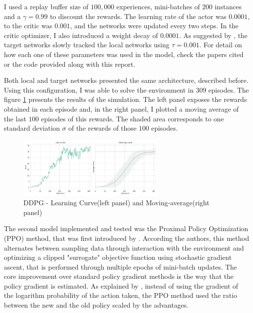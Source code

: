 \documentclass[a4paper]{article}
\begin{document}
I used a replay buffer size of $100,000$ experiences, mini-batches of $200$ instances and a $\gamma=0.99$ to discount the rewards. The learning rate of the actor was $0.0001$, to the critic was $0.001$, and the networks were updated every two steps. In the critic optimizer, I also introduced a weight decay of $0.0001$. As suggested by \cite{Lillicrap:2015ww}, the target networks slowly tracked the local networks using $\tau=0.001$. For detail on how each one of these parameters was used in the model, check the papers cited or the code provided along with this report.

Both local and target networks presented the same architecture, described before. Using this configuration, I was able to solve the environment in $309$ episodes. The figure \ref{fig:ddpg} presents the results of the simulation. The left panel exposes the rewards obtained in each episode and, in the right panel, I plotted a moving average of the last $100$ episodes of this rewards. The shaded area corresponds to one standard deviation $\sigma$ of the rewards of those $100$ episodes.

\begin{figure}[ht]
\centering
\includegraphics[width=0.65\textwidth]{../notebooks/figures/2018-10-07-DDPG-learning-curve.jpg}
\caption{DDPG - Learning Curve(left panel) and Moving-average(right panel)}
\label{fig:ddpg}
\end{figure}



The second model implemented and tested was the Proximal Policy Optimization (PPO) method, that was first introduced by \cite{Schulman:2017vq}. According the authors, this method alternates between sampling data through interaction with the environment and optimizing a clipped "surrogate" objective function using stochastic gradient ascent, that is performed through multiple epochs of mini-batch updates. The core improvement over standard policy gradient methods is the way that the policy gradient is estimated. As explained by \cite{lapan2018deep}, instead of using the gradient of the logarithm probability of the action taken, the PPO method used the ratio between the new and the old policy scaled by the advantages.
\end{document}
